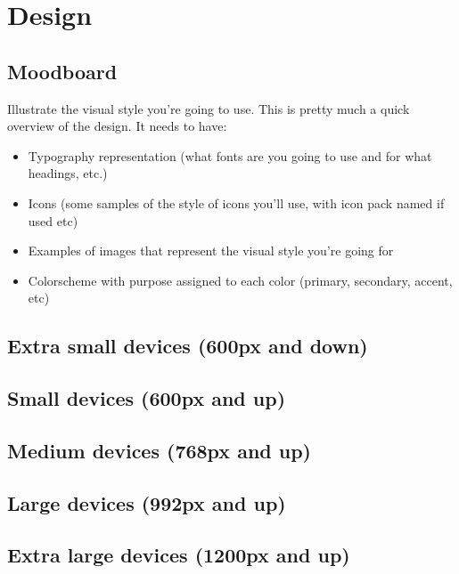 \section{Design}
\subsection{Moodboard}
Illustrate the visual style you're going to use.
This is pretty much a quick overview of the design.
It needs to have:
\begin{itemize}
  \item{Typography representation (what fonts are you going to use and for what headings, etc.)}
  \item{Icons (some samples of the style of icons you'll use, with icon pack named if used etc)}
  \item{Examples of images that represent the visual style you're going for}
  \item{Colorscheme with purpose assigned to each color (primary, secondary, accent, etc)}
\end{itemize}


\subsection{Extra small devices (600px and down)}
\subsection{Small devices (600px and up)}
\subsection{Medium devices (768px and up)}
\subsection{Large devices (992px and up)}
\subsection{Extra large devices (1200px and up)}
\clearpage
